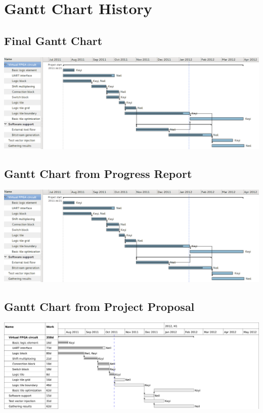 \section{Gantt Chart History}

\subsection{Final Gantt Chart}
\includegraphics[scale=0.45,angle=90]{gantt-final.png}
\label{gantt-final}

\subsection{Gantt Chart from Progress Report}
\includegraphics[scale=0.45,angle=90]{gantt-progress.png}
\label{gantt-progress}


\subsection{Gantt Chart from Project Proposal}
\label{gantt-proposal}
\includegraphics[scale=1.0,angle=90]{gantt-proposal.png}

